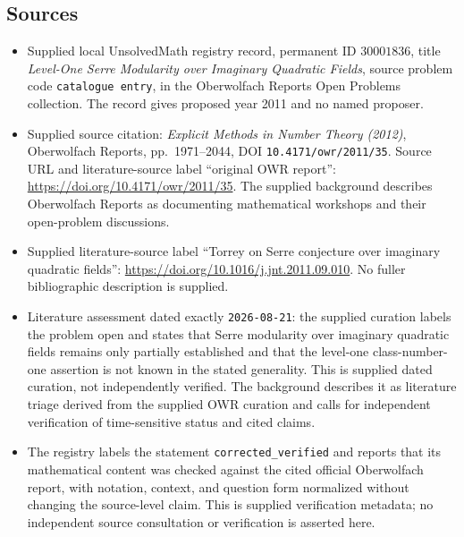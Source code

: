 \documentclass[11pt]{article}
\begin{document}
\subsection{Sources}
\begin{itemize}
\item Supplied local UnsolvedMath registry record, permanent ID \(30001836\), title \emph{Level-One Serre Modularity over Imaginary Quadratic Fields}, source problem code \texttt{catalogue entry}, in the Oberwolfach Reports Open Problems collection. The record gives proposed year 2011 and no named proposer.
\item Supplied source citation: \emph{Explicit Methods in Number Theory (2012)}, Oberwolfach Reports, pp.~1971--2044, DOI \texttt{10.4171/owr/2011/35}. Source URL and literature-source label ``original OWR report'': \url{https://doi.org/10.4171/owr/2011/35}. The supplied background describes Oberwolfach Reports as documenting mathematical workshops and their open-problem discussions.
\item Supplied literature-source label ``Torrey on Serre conjecture over imaginary quadratic fields'': \url{https://doi.org/10.1016/j.jnt.2011.09.010}. No fuller bibliographic description is supplied.
\item Literature assessment dated exactly \texttt{2026-08-21}: the supplied curation labels the problem open and states that Serre modularity over imaginary quadratic fields remains only partially established and that the level-one class-number-one assertion is not known in the stated generality. This is supplied dated curation, not independently verified. The background describes it as literature triage derived from the supplied OWR curation and calls for independent verification of time-sensitive status and cited claims.
\item The registry labels the statement \texttt{corrected\_verified} and reports that its mathematical content was checked against the cited official Oberwolfach report, with notation, context, and question form normalized without changing the source-level claim. This is supplied verification metadata; no independent source consultation or verification is asserted here.
\end{itemize}
\end{document}
